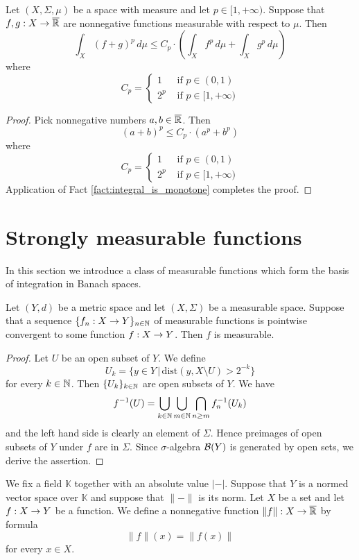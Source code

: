 \begin{proposition}\label{proposition:p_power_of_norm_inequality}
    Let $(X,\Sigma,\mu)$ be a space with measure and let $p \in [1,+\infty)$. Suppose that $f,g:X\rightarrow \overline{{\mathbb R}}$ are nonnegative functions measurable with respect to $\mu$. Then
    $$\int_X\left(f + g\right)^p\,d\mu \leq C_p\cdot
        \left(\int_X f^p\,d\mu + \int_X g^p\,d\mu\right)$$
    where
    $$C_p = \begin{cases}
            1   & \mbox{ if }p\in (0,1)       \\
            2^p & \mbox{ if }p\in [1,+\infty)
        \end{cases}$$
\end{proposition}
\begin{proof}
    Pick nonnegative numbers $a,b\in \overline{{\mathbb R}}$. Then
    $$\left(a + b\right)^p \leq C_p\cdot \left(a^p + b^p\right)$$
    where
    $$C_p = \begin{cases}
            1   & \mbox{ if }p\in (0,1)       \\
            2^p & \mbox{ if }p\in [1,+\infty)
        \end{cases}$$
    Application of Fact \ref{fact:integral_is_monotone} completes the proof.
\end{proof}

\section{Strongly measurable functions}
\noindent
In this section we introduce a class of measurable functions which form the basis of integration in Banach spaces.

\begin{proposition}\label{proposition:measurable_functions_closed_under_pointwise_limits}
    Let $(Y,d)$ be a metric space and let $(X,\Sigma)$ be a measurable space. Suppose that a sequence $\{f_n:X\rightarrow Y\}_{n\in {\mathbb N}}$ of measurable functions is pointwise convergent to some function $f:X\rightarrow Y$. Then $f$ is measurable.
\end{proposition}
\begin{proof}
    Let $U$ be an open subset of $Y$. We define
    $$U_k = \big\{y \in Y\,\big|\,\mathrm{dist}\left(y,X\setminus U\right) > 2^{-k}\big\}$$
    for every $k\in {\mathbb N}$. Then $\{U_k\}_{k\in {\mathbb N}}$ are open subsets of $Y$. We have
    $$f^{-1}(U) =\bigcup_{k\in {\mathbb N}}\bigcup_{m\in {\mathbb N}}\bigcap_{n\geq m}f_n^{-1}(U_k)$$
    and the left hand side is clearly an element of $\Sigma$. Hence preimages of open subsets of $Y$ under $f$ are in $\Sigma$. Since $\sigma$-algebra ${\mathcal B}(Y)$ is generated by open sets, we derive the assertion.
\end{proof}
\noindent
We fix a field $\mathbb{K}$ together with an absolute value $|-|$. Suppose that $Y$ is a normed vector space over $\mathbb{K}$ and suppose that $\lVert-\rVert$ is its norm. Let $X$ be a set and let $f:X\rightarrow Y$ be a function. We define a nonnegative function $\lVert f \rVert:X\rightarrow \overline{{\mathbb R}}$ by formula
$$\lVert f\rVert (x) = \lVert f(x) \rVert$$
for every $x\in X$.

